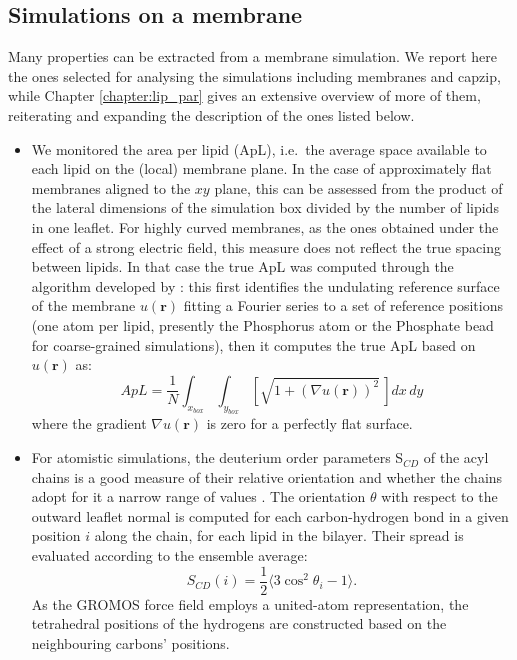 \subsection{Simulations on a membrane}

Many properties can be extracted from a membrane simulation. We report here the ones selected for analysing the simulations including membranes and capzip, while Chapter \ref{chapter:lip_par} gives an extensive overview of more of them, reiterating and expanding the description of the ones listed below.

\begin{itemize}
\item We monitored the area per lipid (ApL), i.e.\ the average space available to each lipid on the (local) membrane plane. In the case of approximately flat membranes aligned to the $xy$ plane, this can be assessed from the product of the lateral dimensions of the simulation box divided by the number of lipids in one leaflet.
%
For highly curved membranes, as the ones obtained under the effect of a strong electric field, this measure does not reflect the true spacing between lipids. In that case the true ApL was computed through the algorithm developed by \citet{Braun2011}: this first identifies the undulating reference surface of the membrane $u(\textbf{r})$ fitting a Fourier series to a set of reference positions (one atom per lipid, presently the Phosphorus atom or the Phosphate bead for coarse-grained simulations), then it computes the true ApL based on $u(\textbf{r})$ as:
\begin{equation}
ApL = \frac{1}{N} \int_{x_{box}} \int_{y_{box}} \left[ \sqrt{1 + \left( \nabla u(\textbf{r}) \right)^2} \, \right] dx\,dy
\end{equation}
where the gradient $\nabla u(\textbf{r})$ is zero for a perfectly flat surface.

\item For atomistic simulations, the deuterium order parameters S$_{CD}$ of the acyl chains is a good measure of their relative orientation and whether the chains adopt for it a narrow range of values \citep{VanLehn2014a,Douliez1998,Piggot2017}. The orientation $\theta$ with respect to the outward leaflet normal is computed for each carbon-hydrogen bond in a given position $i$ along the chain, for each lipid in the bilayer. Their spread is evaluated according to the ensemble average:
\begin{equation}
S_{CD}(i) = \frac{1}{2} \langle 3\cos^2 \theta_i - 1 \rangle.
\end{equation}
As the GROMOS force field employs a united-atom representation, the tetrahedral positions of the hydrogens are constructed based on the neighbouring carbons’ positions.


\end{itemize}
